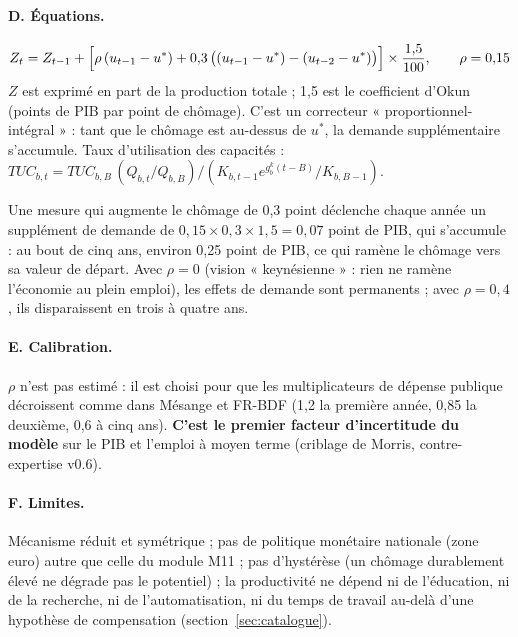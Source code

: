 \paragraph{D. Équations.}
\begin{equation}
Z_t = Z_{t-1} + \Bigl[\rho\,(u_{t-1}-u^*) + 0{,}3\,\bigl((u_{t-1}-u^*)-(u_{t-2}-u^*)\bigr)\Bigr]\times\frac{1{,}5}{100},\qquad \rho = 0{,}15
\end{equation}
$Z$ est exprimé en part de la production totale ; 1,5 est le coefficient d'Okun (points de PIB par point de chômage).
C'est un correcteur « proportionnel-intégral » : tant que le chômage est au-dessus de $u^*$, la demande supplémentaire
s'accumule. Taux d'utilisation des capacités : $TUC_{b,t} = TUC_{b,B}\,(Q_{b,t}/Q_{b,B})/(K_{b,t-1}e^{g^k_b(t-B)}/K_{b,B-1})$.

\begin{exemple}
Une mesure qui augmente le chômage de 0,3 point déclenche chaque année un supplément de demande de
$0{,}15\times0{,}3\times1{,}5 = 0{,}07$ point de PIB, qui s'accumule : au bout de cinq ans, environ 0,25 point de PIB, ce
qui ramène le chômage vers sa valeur de départ. Avec $\rho = 0$ (vision « keynésienne » : rien ne ramène l'économie
au plein emploi), les effets de demande sont permanents ; avec $\rho = 0{,}4$, ils disparaissent en trois à quatre ans.
\end{exemple}

\paragraph{E. Calibration.} $\rho$ n'est pas estimé : il est choisi pour que les multiplicateurs de dépense publique
décroissent comme dans Mésange et FR-BDF (1,2 la première année, 0,85 la deuxième, 0,6 à cinq ans). \textbf{C'est le
premier facteur d'incertitude du modèle} sur le PIB et l'emploi à moyen terme (criblage de Morris, contre-expertise
v0.6).

\paragraph{F. Limites.} Mécanisme réduit et symétrique ; pas de politique monétaire nationale (zone euro) autre que
celle du module M11 ; pas d'hystérèse (un chômage durablement élevé ne dégrade pas le potentiel) ; la productivité ne
dépend ni de l'éducation, ni de la recherche, ni de l'automatisation, ni du temps de travail au-delà d'une hypothèse de
compensation (section~\ref{sec:catalogue}).

